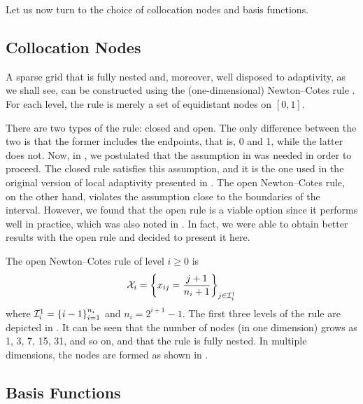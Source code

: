 Let us now turn to the choice of collocation nodes and basis functions.

\subsection{Collocation Nodes}

A sparse grid that is fully nested and, moreover, well disposed to adaptivity,
as we shall see, can be constructed using the (one-dimensional) Newton--Cotes
rule \cite{ma2009}. For each level, the rule is merely a set of equidistant
nodes on $[0, 1]$.

There are two types of the rule: closed and open. The only difference between
the two is that the former includes the endpoints, that is, 0 and 1, while the
latter does not. Now, in , we postulated that the assumption in
 was needed in order to proceed. The closed rule
satisfies this assumption, and it is the one used in the original version of
local adaptivity presented in \cite{ma2009}. The open Newton--Cotes rule, on the
other hand, violates the assumption close to the boundaries of the interval.
However, we found that the open rule is a viable option since it performs well
in practice, which was also noted in \cite{klimke2006}. In fact, we were able to
obtain better results with the open rule and decided to present it here.

The open Newton--Cotes rule of level $i \geq 0$ is
\[
  \mathcal{X}_i = \left\{ x_{ij} = \frac{j + 1}{n_i + 1} \right\}_{j \in \mathcal{I}^{1}_{i}}
\]
where $\mathcal{I}^{1}_{i} = \left\{ i - 1 \right\}_{i = 1}^{n_i}$ and $n_i =
2^{i + 1} - 1$. The first three levels of the rule are depicted in .
It can be seen that the number of nodes (in one dimension) grows as 1, 3, 7, 15,
31, and so on, and that the rule is fully nested. In multiple dimensions, the
nodes are formed as shown in .

\subsection{Basis Functions}

